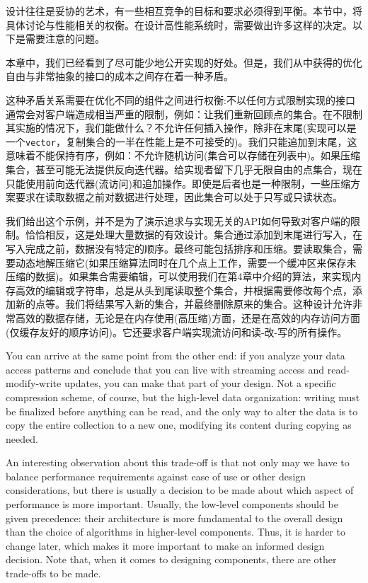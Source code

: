 
设计往往是妥协的艺术，有一些相互竞争的目标和要求必须得到平衡。本节中，将具体讨论与性能相关的权衡。在设计高性能系统时，需要做出许多这样的决定。以下是需要注意的问题。


本章中，我们已经看到了尽可能少地公开实现的好处。但是，我们从中获得的优化自由与非常抽象的接口的成本之间存在着一种矛盾。 

这种矛盾关系需要在优化不同的组件之间进行权衡:不以任何方式限制实现的接口通常会对客户端造成相当严重的限制，例如：让我们重新回顾点的集合。在不限制其实施的情况下，我们能做什么？不允许任何插入操作，除非在末尾(实现可以是一个\texttt{vector}，复制集合的一半在性能上是不可接受的)。我们只能追加到末尾，这意味着不能保持有序，例如：不允许随机访问(集合可以存储在列表中)。如果压缩集合，甚至可能无法提供反向迭代器。给实现者留下几乎无限自由的点集合，现在只能使用前向迭代器(流访问)和追加操作。即使是后者也是一种限制，一些压缩方案要求在读取数据之前对数据进行处理，因此集合可以处于只写或只读状态。

我们给出这个示例，并不是为了演示追求与实现无关的API如何导致对客户端的限制。恰恰相反，这是处理大量数据的有效设计。集合通过添加到末尾进行写入，在写入完成之前，数据没有特定的顺序。最终可能包括排序和压缩。要读取集合，需要动态地解压缩它(如果压缩算法同时在几个点上工作，需要一个缓冲区来保存未压缩的数据)。如果集合需要编辑，可以使用我们在第4章中介绍的算法，来实现内存高效的编辑或字符串，总是从头到尾读取整个集合，并根据需要修改每个点，添加新的点等。我们将结果写入新的集合，并最终删除原来的集合。这种设计允许非常高效的数据存储，无论是在内存使用(高压缩)方面，还是在高效的内存访问方面(仅缓存友好的顺序访问)。它还要求客户端实现流访问和读-改-写的所有操作。 

You can arrive at the same point from the other end: if you analyze your data access patterns and conclude that you can live with streaming access and read-modify-write updates, you can make that part of your design. Not a specific compression scheme, of course, but the high-level data organization: writing must be finalized before anything can be read, and the only way to alter the data is to copy the entire collection to a new one, modifying its content during copying as needed. 

An interesting observation about this trade-off is that not only may we have to balance performance requirements against ease of use or other design considerations, but there is usually a decision to be made about which aspect of performance is more important. Usually, the low-level components should be given precedence: their architecture is more fundamental to the overall design than the choice of algorithms in higher-level components. Thus, it is harder to change later, which makes it more important to make an informed design decision. Note that, when it comes to designing components, there are other trade-offs to be made. 


